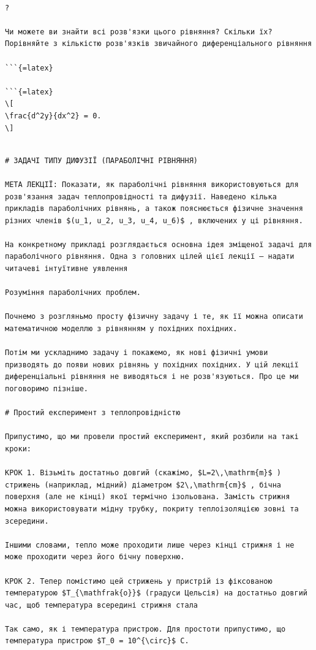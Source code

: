 \documentclass[
]{article}
\begin{document}
\begin{verbatim}

?

Чи можете ви знайти всі розв'язки цього рівняння? Скільки їх? Порівняйте з кількістю розв'язків звичайного диференціального рівняння

```{=latex}

```{=latex}
\[
\frac{d^2y}{dx^2} = 0.
\]
\end{verbatim}

\begin{verbatim}

# ЗАДАЧІ ТИПУ ДИФУЗІЇ (ПАРАБОЛІЧНІ РІВНЯННЯ)

МЕТА ЛЕКЦІЇ: Показати, як параболічні рівняння використовуються для розв'язання задач теплопровідності та дифузії. Наведено кілька прикладів параболічних рівнянь, а також пояснюється фізичне значення різних членів $(u_1, u_2, u_3, u_4, u_6)$ , включених у ці рівняння.

На конкретному прикладі розглядається основна ідея зміщеної задачі для параболічного рівняння. Одна з головних цілей цієї лекції — надати читачеві інтуїтивне уявлення

Розуміння параболічних проблем.

Почнемо з розгляньмо просту фізичну задачу і те, як її можна описати математичною моделлю з рівнянням у похідних похідних.

Потім ми ускладнимо задачу і покажемо, як нові фізичні умови призводять до появи нових рівнянь у похідних похідних. У цій лекції диференціальні рівняння не виводяться і не розв'язуються. Про це ми поговоримо пізніше.

# Простий експеримент з теплопровідністю

Припустимо, що ми провели простий експеримент, який розбили на такі кроки:

КРОК 1. Візьміть достатньо довгий (скажімо, $L=2\,\mathrm{m}$ ) стрижень (наприклад, мідний) діаметром $2\,\mathrm{cm}$ , бічна поверхня (але не кінці) якої термічно ізольована. Замість стрижня можна використовувати мідну трубку, покриту теплоізоляцією зовні та зсередини.

Іншими словами, тепло може проходити лише через кінці стрижня і не може проходити через його бічну поверхню.

КРОК 2. Тепер помістимо цей стрижень у пристрій із фіксованою температурою $T_{\mathfrak{o}}$ (градуси Цельсія) на достатньо довгий час, щоб температура всередині стрижня стала

Так само, як і температура пристрою. Для простоти припустимо, що температура пристрою $T_0 = 10^{\circ}$ C.


\end{verbatim}
\end{document}
